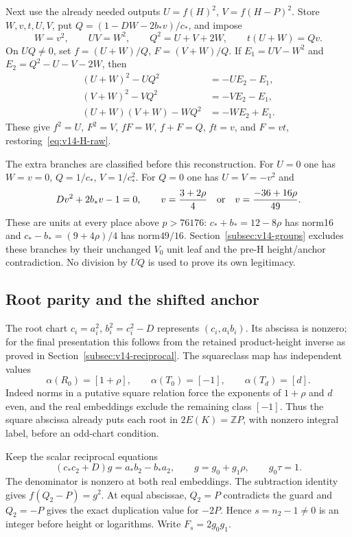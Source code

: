 Next use the already needed outputs $U=f(H)^2$, $V=f(H-P)^2$.
Store $W,v,t,U,V$, put $Q=(1-DW-2b_*v)/c_*$, and impose
\begin{equation}\label{eq:v14-H-squared}
 W=v^2,\qquad UV=W^2,\qquad Q^2=U+V+2W,\qquad t(U+W)=Qv.
\end{equation}
On $UQ\ne0$, set $f=(U+W)/Q$, $F=(V+W)/Q$. If
$E_1=UV-W^2$ and $E_2=Q^2-U-V-2W$, then
\begin{align*}
 (U+W)^2-UQ^2&=-UE_2-E_1,\\
 (V+W)^2-VQ^2&=-VE_2-E_1,\\
 (U+W)(V+W)-WQ^2&=-WE_2+E_1.
\end{align*}
These give $f^2=U$, $F^2=V$, $fF=W$, $f+F=Q$, $ft=v$,
and $F=vt$, restoring~\eqref{eq:v14-H-raw}.

The extra branches are classified before this reconstruction.
For $U=0$ one has $W=v=0$, $Q=1/c_*$, $V=1/c_*^2$.
For $Q=0$ one has $U=V=-v^2$ and
\[
 Dv^2+2b_*v-1=0,\qquad
 v=\frac{3+2\rho}{4}\quad\hbox{or}\quad
 v=\frac{-36+16\rho}{49}.
\]
These are units at every place above $p>76176$:
$c_*+b_*=12-8\rho$ has norm16 and
$c_*-b_*=(9+4\rho)/4$ has norm$49/16$.
Section~\ref{subsec:v14-groups} excludes these branches by their
unchanged $V_0$ unit leaf and the pre-H height/anchor contradiction.
No division by $UQ$ is used to prove its own legitimacy.

\subsection{Root parity and the shifted anchor}\label{subsec:v14-parity}
The root chart $c_i=a_i^2$, $b_i^2=c_i^2-D$ represents
$(c_i,a_ib_i)$. Its abscissa is nonzero; for the final presentation
this follows from the retained product-height inverse as proved in
Section~\ref{subsec:v14-reciprocal}.
The squareclass map has independent values
\[
 \alpha(R_0)=[1+\rho],\qquad \alpha(T_0)=[-1],\qquad
 \alpha(T_d)=[d].
\]
Indeed norms in a putative square relation force the exponents
of $1+\rho$ and $d$ even, and the real embeddings exclude the
remaining class $[-1]$. Thus the square abscissa already puts
each root in $2E(K)=\mathbb ZP$, with nonzero integral label,
before an odd-chart condition.

Keep the scalar reciprocal equations
\[
 (c_*c_2+D)g=a_*b_2-b_*a_2,\qquad
 g=g_0+g_1\rho,\qquad g_0\tau=1.
\]
The denominator is nonzero at both real embeddings. The subtraction
identity gives $f(Q_2-P)=g^2$. At equal abscissae, $Q_2=P$
contradicts the guard and $Q_2=-P$ gives the exact duplication
value for $-2P$. Hence $s=n_2-1\ne0$ is an integer before height
or logarithms. Write $F_s=2g_0g_1$.

